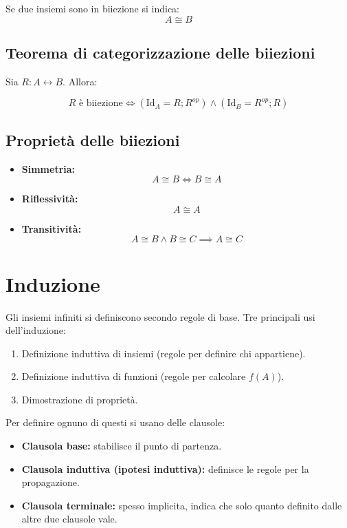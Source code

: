 \documentclass[a4paper,12pt]{article}
\let\oldsection\section
\renewcommand{\section}{\clearpage\oldsection}
\begin{document}
Se due insiemi sono in biiezione si indica:
\[
A \cong B
\]

\subsection{Teorema di categorizzazione delle biiezioni}
Sia $R: A \leftrightarrow B$. Allora:

\[
R \text{ è biiezione} \iff (\text{Id}_A = R;R^{op}) \wedge (\text{Id}_B = R^{op};R)
\]

\subsection{Proprietà delle biiezioni}
\begin{itemize}
    \item \textbf{Simmetria:} 
    \[
    A \cong B \iff B \cong A
    \]
    \item \textbf{Riflessività:} 
    \[
    A \cong A
    \]
    \item \textbf{Transitività:} 
    \[
    A \cong B \wedge B \cong C \implies A \cong C
    \]
\end{itemize}

\section{Induzione}

Gli insiemi infiniti si definiscono secondo regole di base.  
Tre principali usi dell'induzione:

\begin{enumerate}
    \item Definizione induttiva di insiemi (regole per definire chi appartiene).
    \item Definizione induttiva di funzioni (regole per calcolare $f(A)$).
    \item Dimostrazione di proprietà.
\end{enumerate}

Per definire ognuno di questi si usano delle clausole:

\begin{itemize}
    \item \textbf{Clausola base:} stabilisce il punto di partenza.
    \item \textbf{Clausola induttiva (ipotesi induttiva):} definisce le regole per la propagazione.
    \item \textbf{Clausola terminale:} spesso implicita, indica che solo quanto definito dalle altre due clausole vale.
\end{itemize}
\end{document}
